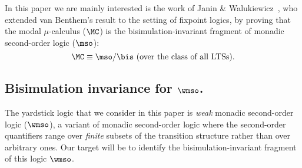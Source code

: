 In this paper we are mainly interested is the work of Janin \&
Walukiewicz~\cite{Jan96}, who extended van Benthem's result to the setting
of fixpoint logics, by proving that the modal $\mu$-calculus ($\MC$) is the
bisimulation-invariant fragment of monadic second-order
logic ($\mso$):
\begin{equation*}
\MC \equiv \mso/{\bis} \text{ (over the class of all LTSs)}.
\end{equation*}

\subsection{Bisimulation invariance for $\wmso$.}
The yardstick logic that we consider in this paper is \emph{weak} monadic
second-order logic ($\wmso$), a variant of monadic second-order logic where
the second-order quantifiers range over \emph{finite} subsets of the
transition structure rather than over arbitrary ones.
Our target will be to identify the bisimulation-invariant fragment of this
logic $\wmso$.

